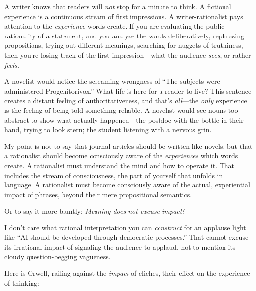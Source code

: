{
 A writer knows that readers will \textit{not} stop for a minute to
think. A fictional experience is a continuous stream of first
impressions. A writer-rationalist pays attention to the
\textit{experience} words create. If you are evaluating the public
rationality of a statement, and you analyze the words deliberatively,
rephrasing propositions, trying out different meanings, searching for
nuggets of truthiness, then you're losing track of the
first impression---what the audience \textit{sees}, or rather
\textit{feels.}}

{
 A novelist would notice the screaming wrongness of
``The subjects were administered
Progenitorivox.'' What life is here for a reader to
live? This sentence creates a distant feeling of authoritativeness, and
that's \textit{all}{}---the \textit{only} experience is
the feeling of being told something reliable. A novelist would see
nouns too abstract to show what actually happened---the postdoc with
the bottle in their hand, trying to look stern; the student listening
with a nervous grin.}

{
 My point is not to say that journal articles should be written
like novels, but that a rationalist should become consciously aware of
the \textit{experiences} which words create. A rationalist must
understand the mind and how to operate it. That includes the stream of
consciousness, the part of yourself that unfolds in language. A
rationalist must become consciously aware of the actual, experiential
impact of phrases, beyond their mere propositional semantics.}

{
 Or to say it more bluntly: \textit{Meaning does not excuse
impact!}}

{
 I don't care what rational interpretation you can
\textit{construct} for an applause light like ``AI
should be developed through democratic processes.''
That cannot excuse its irrational impact of signaling the audience to
applaud, not to mention its cloudy question-begging vagueness.}

{
 Here is Orwell, railing against the \textit{impact} of cliches,
their effect on the experience of thinking:}


